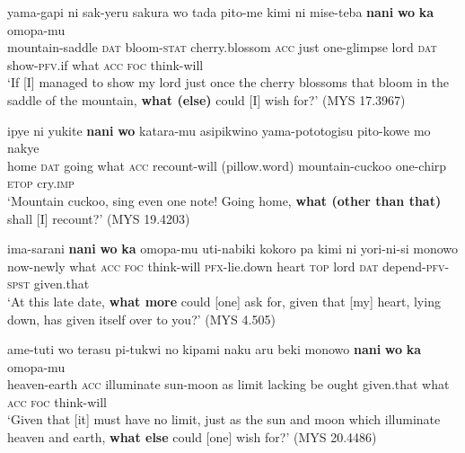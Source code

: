 \documentclass[output=paper]{LSP/langsci}
\begin{document}
\begin{exe}
\ex%
\label{07-fr-ex:23}
\gll yama-gapi ni sak-yeru sakura wo tada pito-me kimi ni mise-teba \textbf{nani} \textbf{wo} \textbf{ka} omopa-mu\\
mountain-saddle \textsc{dat} bloom-\textsc{stat} cherry.blossom \textsc{acc} just one-glimpse lord \textsc{dat} show-\textsc{pfv}.if  what \textsc{acc} \textsc{foc} think-will\\
\glt ‘If [I] managed to show my lord just once the cherry blossoms that bloom in the saddle of the mountain, \textbf{what (else)} could [I] wish for?’ (MYS 17.3967)
\end{exe}

\begin{exe}
\ex%
\label{07-fr-ex:24}
\gll ipye ni yukite \textbf{nani} \textbf{wo} katara-mu asipikwino yama-pototogisu pito-kowe mo nakye\\
home \textsc{dat} going  what \textsc{acc} recount-will (pillow.word) mountain-cuckoo one-chirp \textsc{etop} cry.\textsc{imp}\\
\glt ‘Mountain cuckoo, sing even one note! Going home, \textbf{what (other than that)} shall [I] recount?’   (MYS 19.4203)
\end{exe}

\begin{exe}
\ex%
\label{07-fr-ex:25}
\gll ima-sarani \textbf{nani} \textbf{wo} \textbf{ka} omopa-mu uti-nabiki kokoro pa kimi ni yori-ni-si monowo\\
now-newly what \textsc{acc} \textsc{foc}  think-will \textsc{pfx}-lie.down heart \textsc{top} lord \textsc{dat} depend-\textsc{pfv}-\textsc{spst} given.that\\
\glt ‘At this late date, \textbf{what more} could [one] ask for, given that [my] heart, lying down, has given itself over to you?’   (MYS 4.505)
\end{exe}

\begin{exe}
\ex%
\label{07-fr-ex:26}
\gll ame-tuti wo terasu pi-tukwi no kipami naku aru beki monowo \textbf{nani} \textbf{wo} \textbf{ka} omopa-mu\\
heaven-earth \textsc{acc} illuminate sun-moon as limit lacking be ought given.that  what \textsc{acc} \textsc{foc}  think-will\\
\glt ‘Given that [it] must have no limit, just as the sun and moon which illuminate heaven and earth, \textbf{what else} could [one] wish for?’  (MYS 20.4486)
\end{exe}
\end{document}
